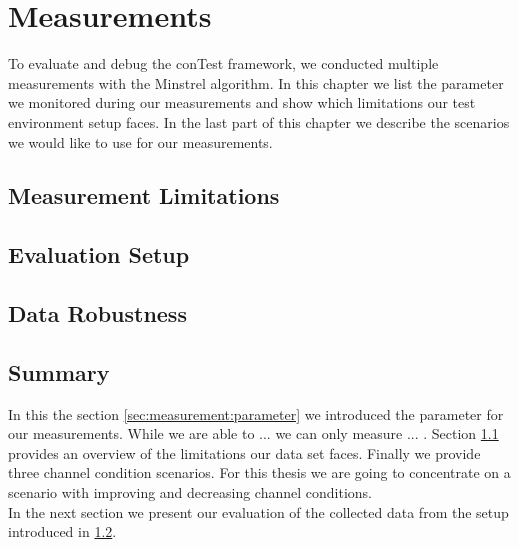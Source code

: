 \chapter{Measurements}
\label{chap:mmeasurement}

To evaluate and debug the conTest framework, we conducted multiple measurements with the Minstrel algorithm. In this chapter we list the parameter we monitored during our measurements and show which limitations our test environment setup faces. In the last part of this chapter we describe the scenarios we would like to use for our measurements.\\

%


\section{Measurement Limitations}
\label{sec:measurement:limits}
%

%

\section{Evaluation Setup}
\label{sec:measurement:eval_setup}
%


%
\newpage
%
 

\section{Data Robustness}
\label{sec:measurement:robust}
%


%
\newpage
%
 

\section{Summary}

In this the section \ref{sec:measurement:parameter} we introduced the parameter for our measurements. While we are able to ... we can only measure ... . Section \ref{sec:measurement:limits} provides an overview of the limitations our data set faces. Finally we provide three channel condition scenarios. For this thesis we are going to concentrate on a scenario with improving and decreasing channel conditions.\\
In the next section we present our evaluation of the collected data from the setup introduced in \ref{sec:measurement:eval_setup}.\\


%
